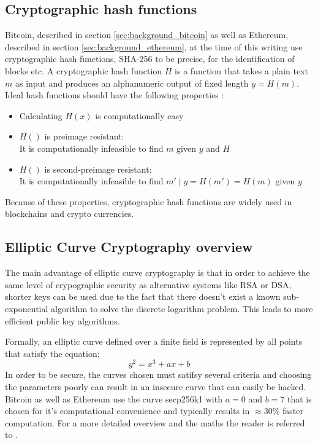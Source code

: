 \documentclass[12pt,msc,a4paper,oneside]{ucl_thesis}
\begin{document}
\subsection{Cryptographic hash functions}
Bitcoin, described in section \ref{sec:background_bitcoin} as well as Ethereum, described in section \ref{sec:background_ethereum}, at the time of this writing use cryptographic hash functions, SHA-256 to be precise, for the identification of blocks etc. A cryptographic hash function $H$ is a function that takes a plain text $m$ as input and produces an alphanumeric output of fixed length $y = H(m)$. Ideal hash functions should have the following properties \cite{BKarp} \cite{wiki:cryptographic_hash_fn}:
\begin{itemize}
    \item{Calculating $H(x)$ is computationally easy}
    \item{$H()$ is preimage resistant: } \\ It is computationally infeasible to find $m$ given $y$ and $H$
    \item{$H()$ is second-preimage resistant: } \\ It is computationally infeasible to find $m' \mid y=H(m')=H(m)$ given $y$
\end{itemize}
Because of these properties, cryptographic hash functions are widely used in blockchains and crypto currencies.

\subsection{Elliptic Curve Cryptography overview} \label{sec:background_elliptic_curve}
The main advantage of elliptic curve cryptography is that in order to achieve the same level of crypographic security as alternative systems like RSA or DSA, shorter keys can be used due to the fact that there doesn't exist a known sub-exponential algorithm to solve the discrete logarithm problem. This leads to more efficient public key algorithms. \cite{EllipticCurveOverview} \cite{Araki1998} 

Formally, an elliptic curve defined over a finite field is represented by all points that satisfy the equation:
\begin{equation}
    y^2 = x^3 + ax + b
\end{equation}
In order to be secure, the curves chosen must satifsy several criteria and choosing the parameters poorly can result in an insecure curve that can easily be hacked. Bitcoin as well as Ethereum use the curve secp256k1 with $a = 0$ and $b = 7$ that is chosen for it's computational convenience and typically results in $\approx 30\%$ faster computation. For a more detailed overview and the maths the reader is referred to \cite{smart2003cryptography}.
\end{document}
